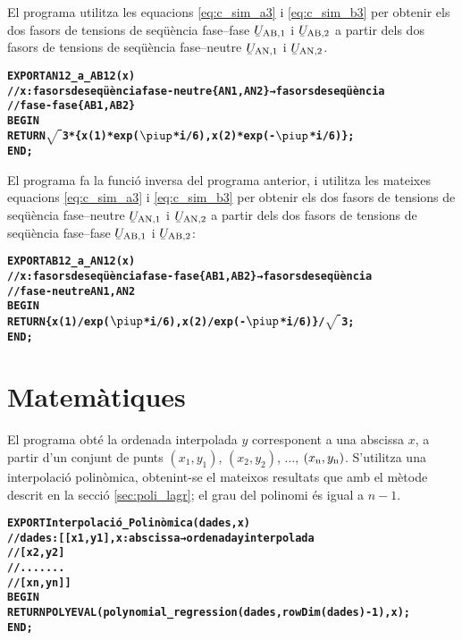 El programa  utilitza les equacions  \eqref{eq:c_sim_a3} i \eqref{eq:c_sim_b3} per obtenir els dos fasors de tensions de seqüència fase--fase $\cmplx{U}\ped{AB,1}$ i  $\cmplx{U}\ped{AB,2}$ a partir dels dos fasors de tensions de seqüència fase--neutre $\cmplx{U}\ped{AN,1}$ i $\cmplx{U}\ped{AN,2}$.
\pagebreak
\begin{alltt}
\bfseries
{}
    EXPORT AN12_a_AB12(x)
    // x:fasors de seqüència fase-neutre \{AN1,AN2\} → fasors de seqüència
    // fase-fase \{AB1,AB2\}
    BEGIN
      RETURN \(\sqrt{\phantom{|}}\)3*\{x(1)*exp(\(\piup\)*i/6),x(2)*exp(-\(\piup\)*i/6)\};
    END;
\end{alltt}

El programa  fa la funció inversa del programa anterior, i utilitza les mateixes equacions  \eqref{eq:c_sim_a3} i \eqref{eq:c_sim_b3} per obtenir els dos fasors de tensions de seqüència fase--neutre $\cmplx{U}\ped{AN,1}$ i $\cmplx{U}\ped{AN,2}$ a partir dels dos fasors de tensions de seqüència fase--fase $\cmplx{U}\ped{AB,1}$ i  $\cmplx{U}\ped{AB,2}$:
\vspace{-1cm}
\begin{alltt}
\bfseries
{}
    EXPORT AB12_a_AN12(x)
    // x:fasors de seqüència fase-fase \{AB1,AB2\} → fasors de seqüència
    // fase-neutre {AN1,AN2}
    BEGIN
      RETURN \{x(1)/exp(\(\piup\)*i/6),x(2)/exp(-\(\piup\)*i/6)\}/\(\sqrt{\phantom{|}}\)3;
    END;
\end{alltt}


\section{Matemàtiques}

El programa  obté la ordenada interpolada $y$ corresponent a una abscissa $x$, a partir d'un conjunt  de punts $(x_1,y_1)$, $(x_2,y_2)$, ..., $(x_\mathrm{n},y_\mathrm{n})$. S'utilitza una interpolació polinòmica, obtenint-se el mateixos resultats que amb el mètode descrit en la secció \vref{sec:poli_lagr}; el grau del polinomi és igual a $n-1$.
\vspace{-1cm}
\begin{alltt}
\bfseries
{}
    EXPORT Interpolació_Polinòmica(dades,x)
    // dades:[[x1,y1], x:abscissa → ordenada y interpolada
    //        [x2,y2]
    //        .......
    //        [xn,yn]]
    BEGIN
      RETURN POLYEVAL(polynomial_regression(dades,rowDim(dades)-1),x);
    END;
\end{alltt}


